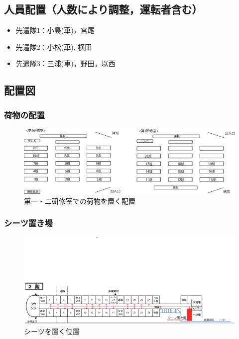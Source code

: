 \subsection{人員配置（人数により調整，運転者含む）}
\begin{itemize}
\item 先遣隊1：小島(車)，宮尾
\item 先遣隊2：小松(車), 横田
\item 先遣隊3：三浦(車)，野田，以西

\end{itemize}

\subsection{配置図}

\subsubsection{荷物の配置}

\begin{figure}[htbp]
 \begin{center}
  \includegraphics[width=150mm]{./03/nimotsu.eps}
\end{center}
 \caption{第一・二研修室での荷物を置く配置}
 \label{fig:nimotsuhaichi}
\end{figure}
\vspace{-10mm}
\subsubsection{シーツ置き場}

\vspace{-30mm}

\begin{figure}[H]
 \begin{center}
 \hspace{-20mm}
  \includegraphics[width=180mm,scale=0.45]{./03/situ.eps}
\end{center}
\vspace{-15mm}
 \caption{シーツを置く位置}
 \label{fig:seatshaichi}
\end{figure}


